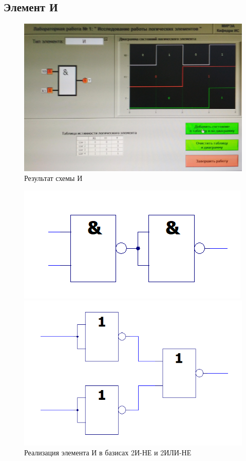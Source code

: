 \subsection{Элемент И}

\begin{figure}[H]
	\centering
	\includegraphics[width=0.85\linewidth]{imgs/1/and}
	\caption{Результат схемы И}
	\label{fig:1_and}
\end{figure}

\begin{figure}[H]
	\centering
	\begin{minipage}{.45\textwidth}
		\centering
		\includegraphics[width=0.85\linewidth]{imgs/1/and_and}
	\end{minipage}
	\begin{minipage}{.45\textwidth}
		\centering
		\includegraphics[width=0.85\linewidth]{imgs/1/and_or}
	\end{minipage}
	\caption{Реализация элемента И в базисах 2И-НЕ и 2ИЛИ-НЕ}
\end{figure}


